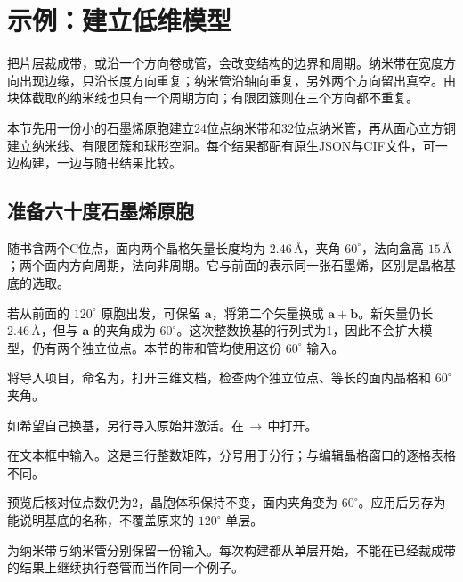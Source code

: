 \section{示例：建立低维模型}\label{sec:nanostructure-examples}

把片层裁成带，或沿一个方向卷成管，会改变结构的边界和周期。纳米带在宽度方向出现边缘，只沿长度方向重复；纳米管沿轴向重复，另外两个方向留出真空。由块体截取的纳米线也只有一个周期方向；有限团簇则在三个方向都不重复。

本节先用一份小的石墨烯原胞建立24位点纳米带和32位点纳米管，再从面心立方铜建立纳米线、有限团簇和球形空洞。每个结果都配有原生JSON与CIF文件，可一边构建，一边与随书结果比较。

\subsection{准备六十度石墨烯原胞}

随书含两个C位点，面内两个晶格矢量长度均为 $2.46\,\text{\AA}$，夹角 $60^\circ$，法向盒高 $15\,\text{\AA}$；两个面内方向周期，法向非周期。它与前面的表示同一张石墨烯，区别是晶格基底的选取。

若从前面的 $120^\circ$ 原胞出发，可保留 $\mathbf a$，将第二个矢量换成 $\mathbf a+\mathbf b$。新矢量仍长 $2.46\,\text{\AA}$，但与 $\mathbf a$ 的夹角成为 $60^\circ$。这次整数换基的行列式为1，因此不会扩大模型，仍有两个独立位点。本节的带和管均使用这份 $60^\circ$ 输入。

\begin{steps}
  \item 将导入项目，命名为，打开三维文档，检查两个独立位点、等长的面内晶格和 $60^\circ$ 夹角。
  \item 如希望自己换基，另行导入原始并激活。在\,$\rightarrow$\,中打开。
  \item 在文本框中输入。这是三行整数矩阵，分号用于分行；与编辑晶格窗口的逐格表格不同。
  \item 预览后核对位点数仍为2，晶胞体积保持不变，面内夹角变为 $60^\circ$。应用后另存为能说明基底的名称，不覆盖原来的 $120^\circ$ 单层。
  \item 为纳米带与纳米管分别保留一份输入。每次构建都从单层开始，不能在已经裁成带的结果上继续执行卷管而当作同一个例子。
\end{steps}

